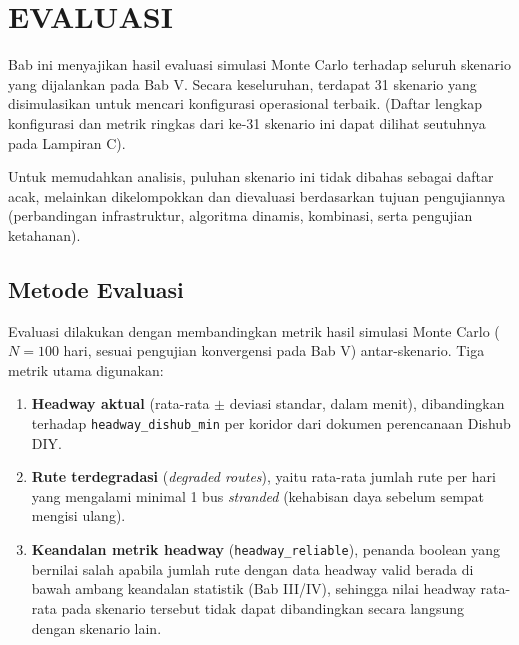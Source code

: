 \cleardoublepage
\chapter{EVALUASI}
\label{chap:evaluasi}

Bab ini menyajikan hasil evaluasi simulasi Monte Carlo terhadap seluruh
skenario yang dijalankan pada Bab V. Secara keseluruhan, terdapat 31 skenario 
yang disimulasikan untuk mencari konfigurasi operasional terbaik. 
(Daftar lengkap konfigurasi dan metrik ringkas dari ke-31 skenario ini dapat dilihat 
seutuhnya pada Lampiran C). 

Untuk memudahkan analisis, puluhan skenario ini tidak dibahas sebagai daftar acak, melainkan dikelompokkan dan dievaluasi 
berdasarkan tujuan pengujiannya (perbandingan infrastruktur, algoritma dinamis, 
kombinasi, serta pengujian ketahanan).

\section{Metode Evaluasi}

Evaluasi dilakukan dengan membandingkan metrik hasil simulasi Monte Carlo
($N=100$ hari, sesuai pengujian konvergensi pada Bab V) antar-skenario.
Tiga metrik utama digunakan:
\begin{enumerate}
	\item \textbf{Headway aktual} (rata-rata $\pm$ deviasi standar, dalam
	menit), dibandingkan terhadap \texttt{headway\_dishub\_min} per koridor
	dari dokumen perencanaan Dishub DIY.
	\item \textbf{Rute terdegradasi} (\textit{degraded routes}), yaitu
	rata-rata jumlah rute per hari yang mengalami minimal 1 bus \textit{
		stranded} (kehabisan daya sebelum sempat mengisi ulang).
	\item \textbf{Keandalan metrik headway} (\texttt{headway\_reliable}),
	penanda boolean yang bernilai salah apabila jumlah rute dengan data
	headway valid berada di bawah ambang keandalan statistik (Bab III/IV),
	sehingga nilai headway rata-rata pada skenario tersebut tidak dapat
	dibandingkan secara langsung dengan skenario lain.
\end{enumerate}

